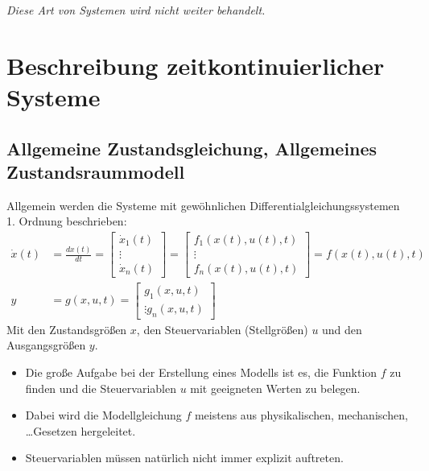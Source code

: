         \textit{Diese Art von Systemen wird nicht weiter behandelt.}

    \section{Beschreibung zeitkontinuierlicher Systeme} %
        \subsection{Allgemeine Zustandsgleichung, Allgemeines Zustandsraummodell} %
            Allgemein werden die Systeme mit gewöhnlichen Differentialgleichungssystemen 1. Ordnung beschrieben:
            \begin{align*}
                \dot{x}(t) &= \frac{d x(t)}{dt} =
	                \begin{bmatrix}
		                \dot{x} _ 1 (t) \\
		                \vdots \\
		                \dot{x} _ n (t)
	                \end{bmatrix}
	            =
		            \begin{bmatrix}
			            f _ 1 (x(t), u(t), t) \\
			            \vdots \\
			            f _ n (x(t), u(t), t)
		            \end{bmatrix}
		        = f(x(t), u(t), t) \\
		        y &= g(x, u, t) =
			        \begin{bmatrix}
				        g _ 1 (x, u, t) \\
				        \vdots
				        g _ n (x, u, t)
			        \end{bmatrix}
            \end{align*}
            Mit den Zustandsgrößen \(x\), den Steuervariablen (Stellgrößen) \(u\) und den Ausgangsgrößen \(y\).
            
            \begin{itemize}
            	\item Die große Aufgabe bei der Erstellung eines Modells ist es, die Funktion \(f\) zu finden und die Steuervariablen \(u\) mit geeigneten Werten zu belegen.
            	\item Dabei wird die Modellgleichung \(f\) meistens aus physikalischen, mechanischen, \dots Gesetzen hergeleitet.
            	\item Steuervariablen müssen natürlich nicht immer explizit auftreten.
            \end{itemize}


